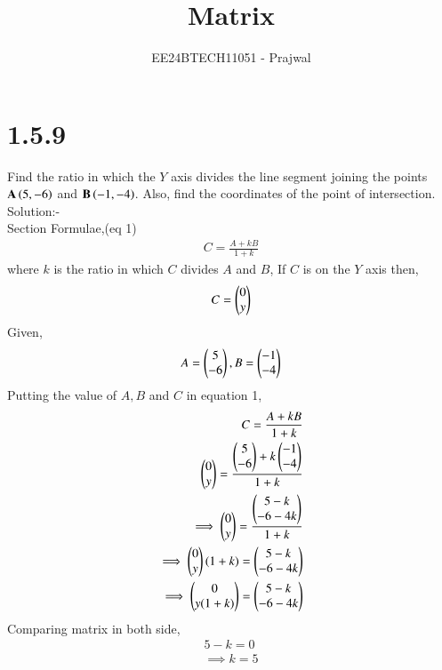 \documentclass[journal]{IEEEtran}
\numberwithin{equation}{enumi}
\numberwithin{figure}{enumi}
\begin{document}

\title{Matrix}
\author{EE24BTECH11051 - Prajwal}
{\let\newpage\relax\maketitle}
\section{1.5.9}
Find the ratio in which the $Y$ axis divides the line segment joining the points $\mathbf{A}\left(5,-6\right)$ and $\mathbf{B}\left(-1,-4\right)$. Also, find the coordinates of the point of intersection.\\ 
Solution:-\\
Section Formulae,\hfill (eq 1)
 \begin{align*}
 C=\frac{A+kB}{1+k} 
 \end{align*}
 where $k$ is the ratio in which $C$ divides $A$ and $B$,
 If $C$ is on the $Y$ axis then,
 \begin{align*}
     C = \begin{pmatrix}0 \\ y\end{pmatrix}
 \end{align*}
 Given,
 \begin{align*}
 A = \begin{pmatrix}5 \\ -6\end{pmatrix},
 B = \begin{pmatrix}-1 \\ -4\end{pmatrix}
 \end{align*}
 Putting the value of $A,B$ and $C$ in equation 1,
 \begin{align*}
 C=\frac{A+kB}{1+k}\\
 \begin{pmatrix}0 \\ y\end{pmatrix} =
 \frac{\begin{pmatrix}5 \\ -6\end{pmatrix} + k\begin{pmatrix}-1 \\ -4\end{pmatrix}}{1+k}\\
 \implies \begin{pmatrix}0 \\ y\end{pmatrix} =
 \frac{\begin{pmatrix}5-k \\ -6-4k\end{pmatrix}}{1+k}\\
 \implies \begin{pmatrix}0 \\ y\end{pmatrix}(1+k) = 
 \begin{pmatrix}5-k \\ -6-4k\end{pmatrix}\\
 \implies \begin{pmatrix}0 \\ y(1+k)\end{pmatrix} =
 \begin{pmatrix}5-k \\ -6-4k\end{pmatrix}
 \end{align*}
 Comparing matrix in both side,
 \begin{align*}
 5-k=0\\
 \implies k=5
 \end{align*}
\end{document}
